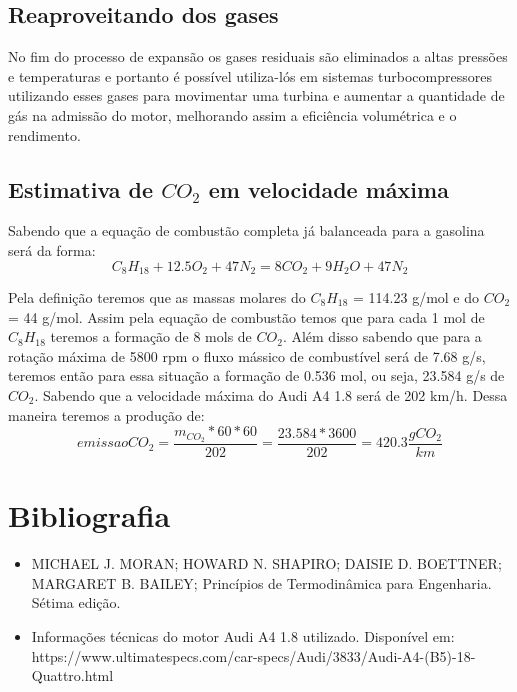 \documentclass[a4paper]{article}
\begin{document}
\subsection{Reaproveitando dos gases}

No fim do processo de expansão os gases residuais são eliminados a altas pressões e temperaturas e portanto é possível utiliza-lós em sistemas turbocompressores utilizando esses gases para movimentar uma turbina e aumentar a quantidade de gás na admissão do motor, melhorando assim a eficiência volumétrica e o rendimento.


\subsection{Estimativa de $CO_{2}$ em velocidade máxima}
Sabendo que a equação de combustão completa já balanceada para a gasolina será da forma:
\begin{equation*}
    C_{8}H_{18} + 12.5O_{2} + 47N_{2} = 8CO_{2} + 9H_{2}O + 47N_{2}
\end{equation*}

Pela definição teremos que as massas molares do $C_{8}H_{18}$ = 114.23 g/mol e do $CO_{2}$ = 44 g/mol. Assim pela equação de combustão temos que para cada 1 mol de $C_{8}H_{18}$ teremos a formação de 8 mols de $CO_{2}$. Além disso sabendo que para a rotação máxima de 5800 rpm o fluxo mássico de combustível será de 7.68 g/s, teremos então para essa situação a formação de 0.536 mol, ou seja, 23.584 g/s de $CO_{2}$. Sabendo que a velocidade máxima do Audi A4 1.8 será de 202 km/h. Dessa maneira teremos a produção de:\\
\begin{equation*}
    emissaoCO_{2} = \frac{m_{CO_{2}}*60*60}{202} = \frac{23.584*3600}{202}  = 420.3  \frac{gCO_{2}}{km}
\end{equation*} 


\newpage
\section{Bibliografia}
\begin{itemize}
    \item MICHAEL J. MORAN; HOWARD N. SHAPIRO; DAISIE D. BOETTNER; MARGARET B. BAILEY; Princípios de Termodinâmica para Engenharia. Sétima edição.
    \item Informações técnicas do motor Audi A4 1.8 utilizado. Disponível em: https://www.ultimatespecs.com/car-specs/Audi/3833/Audi-A4-(B5)-18-Quattro.html
    
    
\end{itemize}
\end{document}

